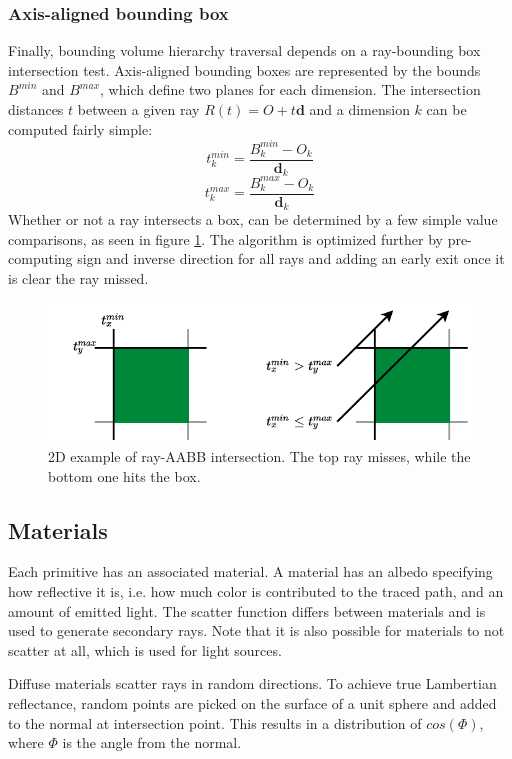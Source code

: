 \subsubsection{Axis-aligned bounding box}
Finally, bounding volume hierarchy traversal depends on a ray-bounding box intersection test. Axis-aligned bounding boxes are represented by the bounds $B^{min}$ and $B^{max}$, which define two planes for each dimension. The intersection distances $t$ between a given ray $R(t) = O+t\textbf{d}$ and a dimension $k$ can be computed fairly simple:
\[
    t^{min}_k = \frac{B_{k}^{min} - O_{k}}{\textbf{d}_{k}}
\]
\[
    t^{max}_k = \frac{B_{k}^{max} - O_{k}}{\textbf{d}_{k}}    
\]
Whether or not a ray intersects a box, can be determined by a few simple value comparisons, as seen in figure  \ref{fig:aabb_intersec}. The algorithm is optimized further by pre-computing sign and inverse direction for all rays and adding an early exit once it is clear the ray missed. 
\begin{figure}[H]
    \centering
    \includegraphics[width=400pt]{images/aabb_intersec.pdf}
    \caption{2D example of ray-AABB intersection. The top ray misses, while the bottom one hits the box.}
    \label{fig:aabb_intersec}
\end{figure}
\clearpage
\subsection{Materials}
Each primitive has an associated material. A material has an albedo specifying how reflective it is, i.e. how much color is contributed to the traced path, and an amount of emitted light. The scatter function differs between materials and is used to generate secondary rays. Note that it is also possible for materials to not scatter at all, which is used for light sources. 

Diffuse materials scatter rays in random directions. To achieve true Lambertian reflectance\cite{weik01lambert}, random points are picked on the surface of a unit sphere and added to the normal at intersection point. This results in a distribution of $cos(\Phi)$, where $\Phi$ is the angle from the normal. 

